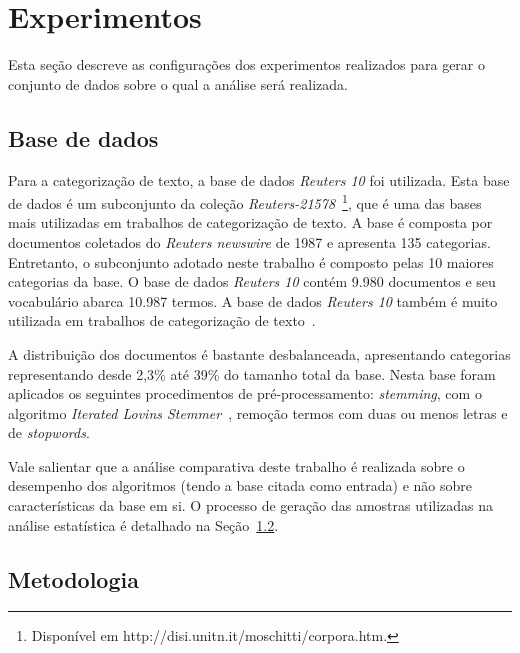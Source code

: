 \documentclass[conference]{IEEEtran}
\begin{document}

\section{Experimentos}
\label{sec:exp}

Esta seção descreve as configurações dos experimentos realizados para gerar o conjunto de dados sobre o qual a análise será realizada.

\subsection{Base de dados}
\label{sec:bd}

Para a categorização de texto, a base de dados \textit{Reuters 10} foi utilizada.
Esta base de dados é um subconjunto da coleção \textit{Reuters-21578}~\footnote{Disponível em http://disi.unitn.it/moschitti/corpora.htm.}, que é uma das bases mais utilizadas em trabalhos de categorização de texto.
A base é composta por documentos coletados do \textit{Reuters newswire} de 1987 e apresenta 135 categorias.
Entretanto, o subconjunto adotado neste trabalho é composto pelas 10 maiores categorias da base.
O base de dados \textit{Reuters 10} contém 9.980 documentos e seu vocabulário abarca 10.987 termos.
A base de dados \textit{Reuters 10} também é muito utilizada em trabalhos de categorização de texto~\cite{chang2008multilabel,chen2009feature,yang2011new}. 

A distribuição dos documentos é bastante desbalanceada, apresentando categorias representando desde 2,3\% até 39\% do tamanho total da base. 
Nesta base foram aplicados os seguintes procedimentos de pré-processamento: \textit{stemming}, com o algoritmo \textit{Iterated Lovins
Stemmer}~\cite{lovins1968development}, 
remoção termos com duas ou menos letras e de \textit{stopwords}.

Vale salientar que  a análise comparativa deste trabalho é realizada sobre o desempenho dos algoritmos (tendo a base citada como entrada) e não sobre características da base em si. O processo de geração das amostras utilizadas na análise estatística é detalhado na Seção~\ref{sec:metodologia}.

\subsection{Metodologia}
\label{sec:metodologia}
\end{document}
